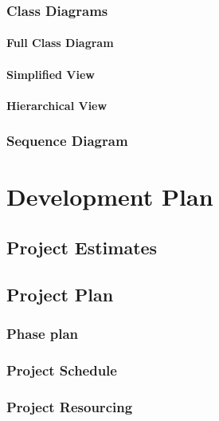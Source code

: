 \documentclass[12pt, a4paper]{article}
\begin{document}
		\subsubsection{Class Diagrams}
		
			\paragraph{Full Class Diagram}
			
			\paragraph{Simplified View}
			
			\paragraph{Hierarchical View}
			
		\subsubsection{Sequence Diagram}
		
\section{Development Plan}

	\subsection{Project Estimates}
	
	\subsection{Project Plan}
	
		\subsubsection{Phase plan}
		\subsubsection{Project Schedule}
		\subsubsection{Project Resourcing}
	
	
	
\end{document}
